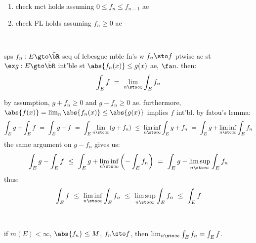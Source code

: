 \begin{exr} \vspace{-0.2in}
	\begin{enumerate}[1)]
		\item check mct holds assuming $0\leq f_{n}\leq f_{n-1}$ ae
		\item check FL holds assuming $f_{n}\geq0$ ae
	\end{enumerate}
\end{exr} \

\begin{thm}[title=Dominated Convergence Theorem]
	sps $f_{n}:E\gto\bar{\bR}$ seq of lebesgue mble fn's w $f_{n}\sto f$ ptwise ae
	st $\ex g:E\gto\bar{\bR}$ int'ble  st $\abs{f_{n}(x)}\leq g(x)$ ae, $\fa n$.
	then:
	\begin{equation*}
		\int_{E}f \ = \ \lim_{n\sto\infty}\int_{E}f_{n}
	\end{equation*}
\end{thm}


\begin{pf}
	by assumption, $g+f_{n}\geq0$ and $g-f_{n}\geq0$ ae.
	furthermore, $\abs{f(x)}=\lim_{n}\abs{f_{n}(x)}\leq\abs{g(x)}$ implies
	$f$ int'bl. by fatou's lemma:
	\begin{equation*}
		\int_{E}g+\int_{E}f \ = \ \int_{E}g+f \ = \ \int_{E}\lim_{n\sto\infty}(g+f_{n})
		\ \leq \ \liminf_{n\sto\infty}\int_{E}g+f_{n}
		\ = \ \int_{E}g+\liminf_{n\sto\infty}\int_{E}f_{n}
	\end{equation*}
	the same argument on $g-f_{n}$ gives us:
	\begin{equation*}
		\int_{E}g-\int_{E}f
		\ \leq \ \int_{E}g+\liminf_{n\sto\infty}\left(-\int_{E}f_{n}\right)
		\ = \ \int_{E}g-\limsup_{n\sto\infty}\int_{E}f_{n}
	\end{equation*}
	thus:
	\begin{equation*}
		\int_{E}f \ \leq \ \liminf_{n\sto\infty}\int_{E}f_{n}
		\ \leq \ \limsup_{n\sto\infty}\int_{E}f_{n} \ \leq \ \int_{E}f
	\end{equation*}
\end{pf} \

\begin{crll}
	if $m(E)<\infty$, $\abs{f_{n}}\leq M$, $f_{n}\sto f$,
	then $\lim_{n\sto\infty}\int_{E}f_{n}=\int_{E}f$.
\end{crll}
